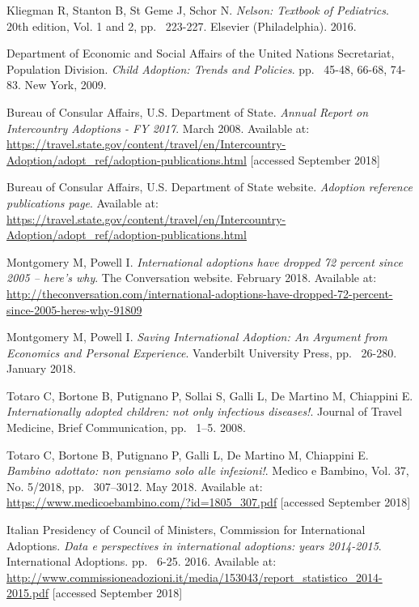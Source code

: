 
\begin{thebibliography}{50}

  Kliegman R, Stanton B, St Geme J, Schor N.
  \textit{Nelson: Textbook of Pediatrics}.
  20th edition, Vol. 1 and 2,
  pp. ~223-227.
  Elsevier (Philadelphia).
  2016.
  
  Department of Economic and Social Affairs of the United Nations Secretariat, Population Division.
  \textit{Child Adoption: Trends and Policies}.
  pp. ~45-48, 66-68, 74-83.
  New York,
  2009.

  Bureau of Consular Affairs, U.S. Department of State.
  \textit{Annual Report on Intercountry Adoptions - FY 2017}.
  March 2008.
  Available at: \url{https://travel.state.gov/content/travel/en/Intercountry-Adoption/adopt_ref/adoption-publications.html} [accessed September 2018]
  
  Bureau of Consular Affairs, U.S. Department of State website.
  \textit{Adoption reference publications page}.
  Available at: \url{https://travel.state.gov/content/travel/en/Intercountry-Adoption/adopt_ref/adoption-publications.html}

  Montgomery M, Powell I.
  \textit{International adoptions have dropped 72 percent since 2005 – here’s why}.
  The Conversation website.
  February 2018.
  Available at: \url{http://theconversation.com/international-adoptions-have-dropped-72-percent-since-2005-heres-why-91809}
  
  Montgomery M, Powell I.
  \textit{Saving International Adoption: An Argument from Economics and Personal Experience}.
  Vanderbilt University Press,
  pp. ~26-280.
  January 2018.
  
  Totaro C, Bortone B, Putignano P, Sollai S, Galli L, De Martino M, Chiappini E.
  \textit{Internationally adopted children: not only infectious diseases!}.
  Journal of Travel Medicine,
  Brief Communication,
  pp. ~1–5.
  2008.
  
  Totaro C, Bortone B, Putignano P, Galli L, De Martino M, Chiappini E.
  \textit{Bambino adottato: non pensiamo solo alle infezioni!}.
  Medico e Bambino, Vol. 37, No. 5/2018,
  pp. ~307–3012.
  May 2018.
  Available at: \url{https://www.medicoebambino.com/?id=1805_307.pdf} [accessed September 2018]
  
  Italian Presidency of Council of Ministers, Commission for International Adoptions.
  \textit{Data e perspectives in international adoptions: years 2014-2015}.
  International Adoptions.
  pp. ~6-25.
  2016.
  Available at: \url{http://www.commissioneadozioni.it/media/153043/report_statistico_2014-2015.pdf} [accessed September 2018]  
  

\end{thebibliography}
